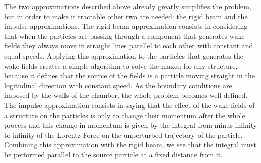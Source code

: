     The two approximations described above already greatly simplifies the problem, but in order to make it tractable other two are needed: the rigid beam and the impulse approximations. The rigid beam approximation consists in considering that when the particles are passing through a component that generates wake fields they always move in straight lines parallel to each other with constant and equal speeds. Applying this approximation to the particles that generates the wake fields creates a simple algorithm to solve the \gls{maxeq} for any structure, because it defines that the source of the fields is a particle moving straight in the logitudinal direction with constant speed. As the boundary conditions are imposed by the walls of the chamber, the whole problem becomes well defined. The impulse approximation consists in saying that the effect of the wake fields of a structure on the particles is only to change their momentum after the whole process and this change in momentum is given by the integral from minus infinity to infinity of the Lorentz Force on the unperturbed trajectory of the particle. Combining this approximation with the rigid beam, we see that the integral must be performed parallel to the source particle at a fixed distance from it.

